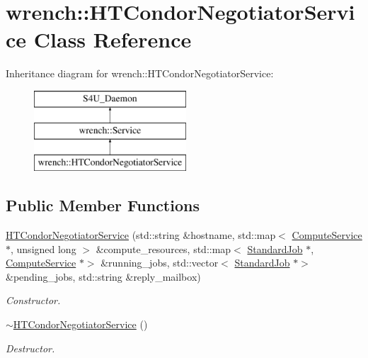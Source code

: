 \hypertarget{classwrench_1_1_h_t_condor_negotiator_service}{}\section{wrench\+:\+:H\+T\+Condor\+Negotiator\+Service Class Reference}
\label{classwrench_1_1_h_t_condor_negotiator_service}
Inheritance diagram for wrench\+:\+:H\+T\+Condor\+Negotiator\+Service\+:\begin{figure}[H]
\begin{center}
\leavevmode
\includegraphics[height=3.000000cm]{classwrench_1_1_h_t_condor_negotiator_service}
\end{center}
\end{figure}
\subsection*{Public Member Functions}
\begin{DoxyCompactItemize}
\item 
\hyperlink{classwrench_1_1_h_t_condor_negotiator_service_a26a062744cd9445e3d77a984d794e53e}{H\+T\+Condor\+Negotiator\+Service} (std\+::string \&hostname, std\+::map$<$ \hyperlink{classwrench_1_1_compute_service}{Compute\+Service} $\ast$, unsigned long $>$ \&compute\+\_\+resources, std\+::map$<$ \hyperlink{classwrench_1_1_standard_job}{Standard\+Job} $\ast$, \hyperlink{classwrench_1_1_compute_service}{Compute\+Service} $\ast$$>$ \&running\+\_\+jobs, std\+::vector$<$ \hyperlink{classwrench_1_1_standard_job}{Standard\+Job} $\ast$$>$ \&pending\+\_\+jobs, std\+::string \&reply\+\_\+mailbox)
\begin{DoxyCompactList}\small\item\em Constructor. \end{DoxyCompactList}\item 
\mbox{\label{classwrench_1_1_h_t_condor_negotiator_service_abbf969719d1b43ccfce10e7546eecea0}} 
\hyperlink{classwrench_1_1_h_t_condor_negotiator_service_abbf969719d1b43ccfce10e7546eecea0}{$\sim$\+H\+T\+Condor\+Negotiator\+Service} ()
\begin{DoxyCompactList}\small\item\em Destructor. \end{DoxyCompactList}\end{DoxyCompactItemize}
